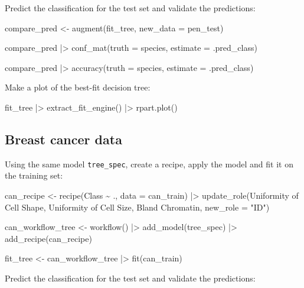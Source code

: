 \documentclass[
  letterpaper,
  DIV=11,
  numbers=noendperiod]{scrreprt}
\newenvironment{Shaded}{\begin{snugshade}}{\end{snugshade}}
\newcommand{\NormalTok}[1]{\textcolor[rgb]{0.00,0.23,0.31}{#1}}
\begin{document}
Predict the classification for the test set and validate the
predictions:

\begin{Shaded}
\begin{Highlighting}[]
\NormalTok{compare\_pred \textless{}{-} augment(fit\_tree, new\_data = pen\_test) }

\NormalTok{compare\_pred |\textgreater{} conf\_mat(truth = species, estimate = .pred\_class)}

\NormalTok{compare\_pred |\textgreater{}  accuracy(truth = species, estimate = .pred\_class)}
\end{Highlighting}
\end{Shaded}

Make a plot of the best-fit decision tree:

\begin{Shaded}
\begin{Highlighting}[]
\NormalTok{fit\_tree |\textgreater{}}
\NormalTok{  extract\_fit\_engine() |\textgreater{}}
\NormalTok{  rpart.plot()}
\end{Highlighting}
\end{Shaded}

\subsection{Breast cancer data}\label{breast-cancer-data-1}

Using the same model \texttt{tree\_spec}, create a recipe, apply the
model and fit it on the training set:

\begin{Shaded}
\begin{Highlighting}[]
\NormalTok{can\_recipe \textless{}{-} }
\NormalTok{  recipe(Class \textasciitilde{} ., data = can\_train) |\textgreater{} }
\NormalTok{  update\_role(\textasciigrave{}Uniformity of Cell Shape\textasciigrave{},  \textasciigrave{}Uniformity of Cell Size\textasciigrave{}, \textasciigrave{}Bland Chromatin\textasciigrave{}, new\_role = "ID")}
  

\NormalTok{can\_workflow\_tree \textless{}{-} workflow() |\textgreater{}}
\NormalTok{  add\_model(tree\_spec) |\textgreater{}}
\NormalTok{  add\_recipe(can\_recipe)}

\NormalTok{fit\_tree \textless{}{-} can\_workflow\_tree |\textgreater{} fit(can\_train)}
\end{Highlighting}
\end{Shaded}

Predict the classification for the test set and validate the
predictions:
\end{document}
